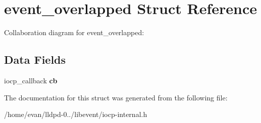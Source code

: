 \section{event\-\_\-overlapped \-Struct \-Reference}
\label{structevent__overlapped}


\-Collaboration diagram for event\-\_\-overlapped\-:
\subsection*{\-Data \-Fields}
\begin{DoxyCompactItemize}
\item 
iocp\-\_\-callback {\bfseries cb}\label{structevent__overlapped_aea6522334ef6ba363497bdb708cc7989}

\end{DoxyCompactItemize}


\-The documentation for this struct was generated from the following file\-:\begin{DoxyCompactItemize}
\item 
/home/evan/lldpd-\/0../libevent/iocp-\/internal.\-h\end{DoxyCompactItemize}
